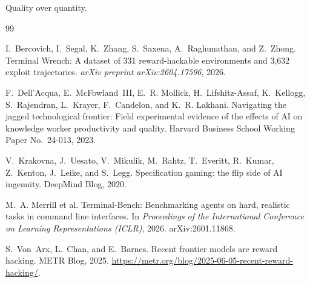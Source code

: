 \documentclass[11pt]{article}
\begin{document}
Quality over quantity.

\begin{thebibliography}{99}

I.~Bercovich, I.~Segal, K.~Zhang, S.~Saxena, A.~Raghunathan, and Z.~Zhong.
\newblock Terminal {W}rench: A dataset of 331 reward-hackable environments and 3,632 exploit trajectories.
\newblock \emph{arXiv preprint arXiv:2604.17596}, 2026.

F.~Dell'Acqua, E.~McFowland~III, E.~R. Mollick, H.~Lifshitz-Assaf, K.~Kellogg, S.~Rajendran, L.~Krayer, F.~Candelon, and K.~R. Lakhani.
\newblock Navigating the jagged technological frontier: Field experimental evidence of the effects of {AI} on knowledge worker productivity and quality.
\newblock Harvard Business School Working Paper No.~24-013, 2023.

V.~Krakovna, J.~Uesato, V.~Mikulik, M.~Rahtz, T.~Everitt, R.~Kumar, Z.~Kenton, J.~Leike, and S.~Legg.
\newblock Specification gaming: the flip side of {AI} ingenuity.
\newblock DeepMind Blog, 2020.

M.~A. Merrill et al.
\newblock Terminal-{B}ench: Benchmarking agents on hard, realistic tasks in command line interfaces.
\newblock In \emph{Proceedings of the International Conference on Learning Representations (ICLR)}, 2026.
\newblock arXiv:2601.11868.

S.~Von~Arx, L.~Chan, and E.~Barnes.
\newblock Recent frontier models are reward hacking.
\newblock METR Blog, 2025.
\newblock \url{https://metr.org/blog/2025-06-05-recent-reward-hacking/}.

\end{thebibliography}
\end{document}
